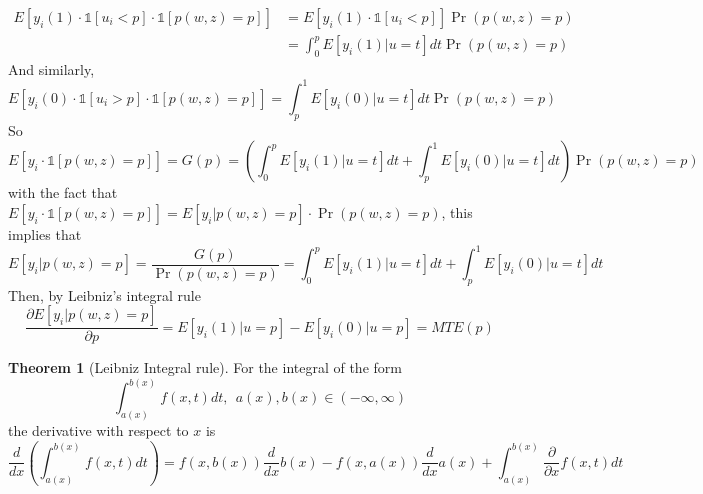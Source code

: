 \documentclass[12pt]{article}
\theoremstyle{definition}
\theoremstyle{property}
\theoremstyle{assumption}
\theoremstyle{example}
\theoremstyle{comment}
\newtheorem{theorem}{Theorem}[section]
\begin{document}
\begin{align*}
E[y_i(1)\cdot \mathbb{1}[u_i<p]\cdot \mathbb{1}[p(w,z)=p]]&=E[y_i(1)\cdot \mathbb{1}[u_i<p]]\Pr(p(w,z)=p)\\
&=\int_0^pE[y_i(1)|u=t]dt\Pr(p(w,z)=p)
\end{align*}
And similarly, 
\[
E[y_i(0)\cdot \mathbb{1}[u_i>p]\cdot \mathbb{1}[p(w,z)=p]]=\int_p^1E[y_i(0)|u=t]dt\Pr(p(w,z)=p)
\]
So 
\small{\[
E[y_i\cdot \mathbb{1}[p(w,z)=p]]=G(p)=\left(\int_0^pE[y_i(1)|u=t]dt+\int_p^1E[y_i(0)|u=t]dt\right)\Pr(p(w,z)=p)
\]}\normalsize
with the fact that $E[y_i\cdot \mathbb{1}[p(w,z)=p]]=E[y_i|p(w,z)=p]\cdot \Pr(p(w,z)=p) $, this implies that
\footnotesize{\[
E[y_i|p(w,z)=p]=\frac{G(p)}{\Pr(p(w,z)=p)}=\int_0^pE[y_i(1)|u=t]dt+\int_p^1E[y_i(0)|u=t]dt
\]}\normalsize
Then, by Leibniz's integral rule
\[
\frac{\partial E[y_i | p(w,z)=p]}{\partial p}=E[y_i(1)|u=p]-E[y_i(0)|u=p]=MTE(p)
\]

\begin{mdframed}[backgroundcolor=green!5] 
\begin{theorem}[Leibniz Integral rule]  
For the integral of the form
\[
\int_{a(x)}^{b(x)} f(x,t)dt, \  \ a(x), b(x) \in (-\infty,\infty)
\]
the derivative with respect to $x$ is
\[
\frac{d}{dx}\left(\int_{a(x)}^{b(x)} f(x,t)dt\right) = f(x,b(x))\frac{d}{dx}b(x) - f(x,a(x))\frac{d}{dx}a(x) +  \int_{a(x)}^{b(x)} \frac{\partial}{\partial x}f(x,t)dt
\]
\end{theorem}
\end{mdframed}
\end{document}
